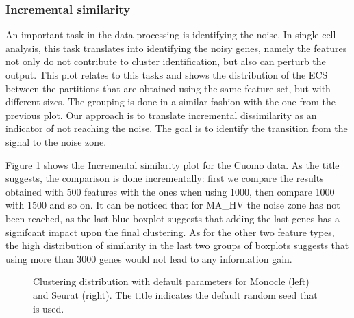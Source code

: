 \subsubsection{Incremental similarity}
An important task in the data processing is identifying the noise. In single-cell analysis, this task translates into identifying the noisy genes, namely the features not only do not contribute to cluster identification, but also can perturb the output. This plot relates to this tasks and shows the distribution of the ECS between the partitions that are obtained using the same feature set, but with different sizes. The grouping is done in a similar fashion with the one from the previous plot. Our approach is to translate incremental dissimilarity as an indicator of not reaching the noise. The goal is to identify the transition from the signal to the noise zone.

Figure \ref{fig:ca-feat-comp} shows the Incremental similarity plot for the Cuomo data. As the title suggests, the comparison is done incrementally: first we compare the results obtained with 500 features with the ones when using 1000, then compare 1000 with 1500 and so on. It can be noticed that for MA\_HV the noise zone has not been reached, as the last blue boxplot suggests that adding the last genes has a signifcant impact upon the final clustering. As for the other two feature types, the high distribution of similarity in the last two groups of boxplots suggests that using more than 3000 genes would not lead to any information gain.

\begin{figure}[H]
    \centering
    \caption{\label{fig:ca-feat-comp}Clustering distribution with default parameters for Monocle (left) and Seurat (right). The title indicates the default random seed that is used.}
\end{figure}

